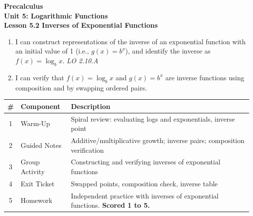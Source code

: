 \documentclass[10pt]{article}
\begin{document}
\vspace{-0.8in}

\begin{center}
  {\color{white}\textbf{\LARGE Precalculus}}\\[4pt]
  {\color{skymid}\large\textbf{Unit 5: Logarithmic Functions}}\\[6pt]
  {\color{white}\textbf{\large Lesson 5.2 \quad Inverses of Exponential Functions}}
\end{center}

\vspace{0.22in}
\namedateperiod
\vspace{0.18in}

\begin{learningtargetbox}
\small
\begin{enumerate}[leftmargin=1.5em, itemsep=5pt]
  \item I can construct representations of the inverse of an exponential function with an
        initial value of 1 (i.e., $g(x) = b^x$), and identify the inverse as $f(x) = \log_b x$.
        \hfill\textit{LO 2.10.A}
  \item I can verify that $f(x) = \log_b x$ and $g(x) = b^x$ are inverse functions using
        composition and by swapping ordered pairs.
\end{enumerate}
\end{learningtargetbox}

\vspace{0.14in}

\begin{tocbox}
\small
\renewcommand{\arraystretch}{1.5}
\begin{tabularx}{\linewidth}{@{} c l X @{}}
\rowcolor{sky}
\textbf{\#} & \textbf{Component} & \textbf{Description} \\
\midrule
1 & Warm-Up        & Spiral review: evaluating logs and exponentials, inverse point \\
2 & Guided Notes   & Additive/multiplicative growth; inverse pairs; composition verification \\
3 & Group Activity & Constructing and verifying inverses of exponential functions \\
4 & Exit Ticket    & Swapped points, composition check, inverse table \\
5 & Homework       & Independent practice with inverses of exponential functions. \textbf{Scored 1 to 5.} \\
\end{tabularx}
\end{tocbox}
\end{document}
